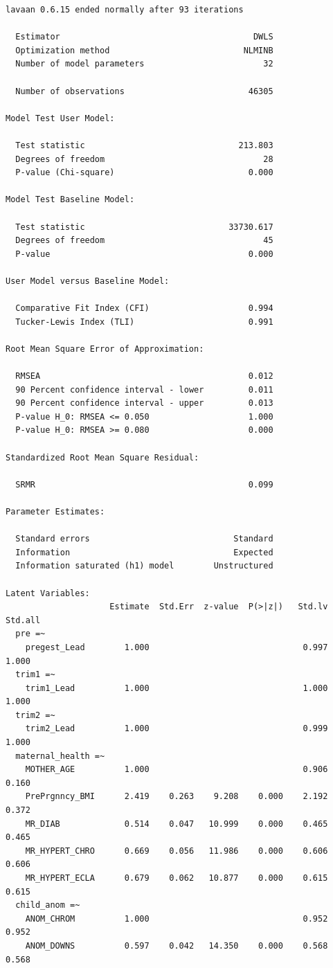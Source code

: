 \documentclass[
  letterpaper,
  DIV=11,
  numbers=noendperiod]{scrartcl}
\begin{document}
\begin{verbatim}
lavaan 0.6.15 ended normally after 93 iterations

  Estimator                                       DWLS
  Optimization method                           NLMINB
  Number of model parameters                        32

  Number of observations                         46305

Model Test User Model:
                                                      
  Test statistic                               213.803
  Degrees of freedom                                28
  P-value (Chi-square)                           0.000

Model Test Baseline Model:

  Test statistic                             33730.617
  Degrees of freedom                                45
  P-value                                        0.000

User Model versus Baseline Model:

  Comparative Fit Index (CFI)                    0.994
  Tucker-Lewis Index (TLI)                       0.991

Root Mean Square Error of Approximation:

  RMSEA                                          0.012
  90 Percent confidence interval - lower         0.011
  90 Percent confidence interval - upper         0.013
  P-value H_0: RMSEA <= 0.050                    1.000
  P-value H_0: RMSEA >= 0.080                    0.000

Standardized Root Mean Square Residual:

  SRMR                                           0.099

Parameter Estimates:

  Standard errors                             Standard
  Information                                 Expected
  Information saturated (h1) model        Unstructured

Latent Variables:
                     Estimate  Std.Err  z-value  P(>|z|)   Std.lv  Std.all
  pre =~                                                                  
    pregest_Lead        1.000                               0.997    1.000
  trim1 =~                                                                
    trim1_Lead          1.000                               1.000    1.000
  trim2 =~                                                                
    trim2_Lead          1.000                               0.999    1.000
  maternal_health =~                                                      
    MOTHER_AGE          1.000                               0.906    0.160
    PrePrgnncy_BMI      2.419    0.263    9.208    0.000    2.192    0.372
    MR_DIAB             0.514    0.047   10.999    0.000    0.465    0.465
    MR_HYPERT_CHRO      0.669    0.056   11.986    0.000    0.606    0.606
    MR_HYPERT_ECLA      0.679    0.062   10.877    0.000    0.615    0.615
  child_anom =~                                                           
    ANOM_CHROM          1.000                               0.952    0.952
    ANOM_DOWNS          0.597    0.042   14.350    0.000    0.568    0.568


\end{verbatim}
\end{document}
